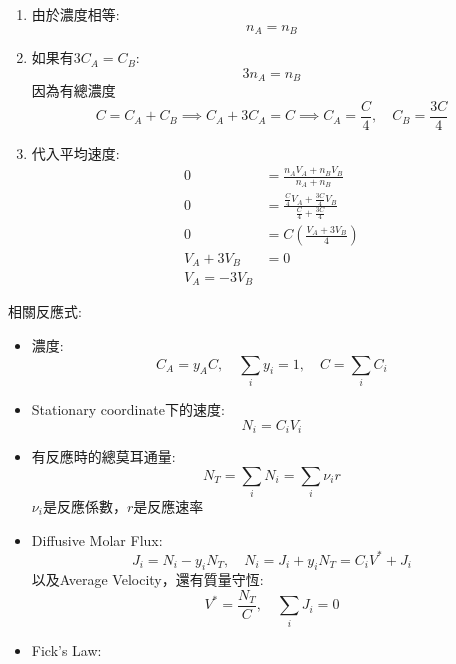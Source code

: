 \documentclass[../main.tex]{subfiles}
\begin{document}
\begin{itemize}
\begin{enumerate}
    \item 由於濃度相等:
    \begin{equation}
      n_A = n_B
    \end{equation}
    \item 如果有$3C_A = C_B$:
    \begin{equation}
      3 n_A = n_B
    \end{equation}
    因為有總濃度
    \begin{equation}
      C = C_A + C_B \implies C_A + 3C_A =C \implies C_A = \frac{C}{4},\quad C_B = \frac{3C}{4}
    \end{equation}
    \item 代入平均速度:
    \begin{align}
      0 &= \frac{n_A V_A + n_B V_B}{n_A + n_B} \nonumber\\
      0 &= \frac{\frac{C}{4} V_A + \frac{3C}{4} V_B}{\frac{C}{4} + \frac{3C}{4}} \nonumber\\
      0 &= C\left(
        \frac{V_A + 3V_B}{4}
      \right) \nonumber\\
      V_A + 3V_B &= 0 \nonumber\\
      \boxed{V_A = -3 V_B}
    \end{align}
  \end{enumerate}
  相關反應式:
  \begin{itemize}
    \item 濃度:
    \begin{equation}
      C_A =y_A C, \quad \sum_i y_i = 1, \quad C = \sum_i C_i
    \end{equation}
    \item Stationary coordinate下的速度:
    \begin{equation}
      N_i = C_i V_i
    \end{equation}
    \item 有反應時的總莫耳通量:
    \begin{equation}
      N_T = \sum_i N_i = \sum_i \nu_i r
    \end{equation}
    $\nu_i$是反應係數，$r$是反應速率
    \item Diffusive Molar Flux:
    \begin{equation}
      J_i = N_i - y_i N_T, \quad N_i = J_i + y_i N_T = C_i V^\ast + J_i
    \end{equation}
    以及Average Velocity，還有質量守恆:
    \begin{equation}
      V^\ast = \frac{N_T}{C}, \quad \sum_i J_i = 0
    \end{equation}
    \item Fick's Law:

\end{itemize}
\end{itemize}
\end{document}

